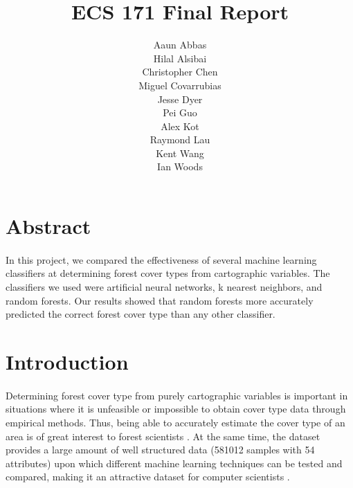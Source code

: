 \documentclass[11pt]{article}
\begin{document}
    \begin{titlepage}
    \title{\Huge ECS 171 Final Report}
    \author{\huge Aaun Abbas\\\huge Hilal Alsibai\\\huge Christopher Chen\\\huge Miguel Covarrubias\\\huge Jesse Dyer\\\huge Pei Guo\\\huge Alex Kot\\\huge Raymond Lau\\\huge Kent Wang\\\huge Ian Woods}
    \maketitle
    \end{titlepage}
    \section{Abstract}
    \paragraph{}
    In this project, we compared the effectiveness of several machine learning classifiers at determining forest cover types from cartographic variables. The classifiers we used were artificial neural networks, k nearest neighbors, and random forests. Our results showed that random forests more accurately predicted the correct forest cover type than any other classifier.
    \section{Introduction}
    \paragraph{}
    Determining forest cover type from purely cartographic variables is important in situations where it is unfeasible or impossible to obtain cover type data through empirical methods. Thus, being able to accurately estimate the cover type of an area is of great interest to forest scientists \cite{blackard00}. At the same time, the dataset provides a large amount of well structured data (581012 samples with 54 attributes) upon which different machine learning techniques can be tested and compared, making it an attractive dataset for computer scientists \cite{gama03,oza01,giannella,furnkranz,obradovic,klami}.
\end{document}
